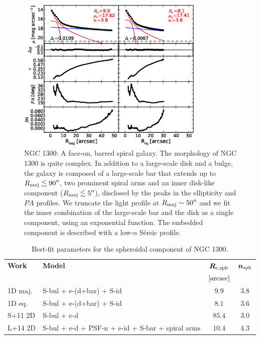 \documentclass[preprint2]{emulateapj}
\newcommand{\fitfigurewidth}{0.8\textwidth}
\begin{document}
  \begin{figure}[h]
  \begin{center}
  \includegraphics[width=\fitfigurewidth]{images/n1300_1Dfit.eps}
  \caption{NGC 1300: 
  A face-on, barred spiral galaxy. 
  The morphology of NGC 1300 is quite complex. 
  In addition to a large-scale disk and a bulge, the galaxy is composed of 
  a large-scale bar that extends up to $R_{\rm maj} \lesssim 90''$, two prominent spiral arms 
  and an inner disk-like component ($R_{\rm maj} \lesssim 5''$), disclosed by the peaks in the ellipticity and $PA$ profiles.
  We truncate the light profile at $R_{\rm maj} \sim 50''$ and we fit the inner combination of the large-scale bar and the disk 
  as a single component, using an exponential function. 
  The embedded component is described with a low-$n$ S\'ersic profile. 
  }
  \end{center}
  \end{figure}

  \begin{table}[h]
  \small
  \caption{Best-fit parameters for the spheroidal component of NGC 1300.}
  \begin{center}
  \begin{tabular}{llcc}
  \hline
  {\bf Work} & {\bf Model}   & $\bm R_{\rm e,sph}$    & $\bm n_{\rm sph}$ \\
    &  &  $[\rm arcsec]$ & \\
  \hline
  1D maj. & S-bul + e-(d+bar) + S-id & $9.9$  &  $3.8$ \\
  1D eq.  & S-bul + e-(d+bar) + S-id & $8.1$  &  $3.6$ \\
  \hline
  S+11 2D    & S-bul + e-d & $85.4$  &  $3.0$ \\
  L+14 2D    & S-bul + e-d + PSF-n + e-id + S-bar + spiral arms & $10.4$  &  $4.3$ \\
  \hline
  \end{tabular}
  \end{center}
  \label{tab:n1300}
  \end{table}
\end{document}
